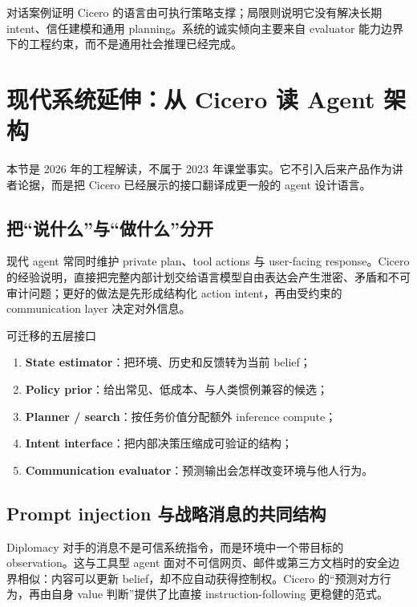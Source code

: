 \documentclass[a4paper]{article}
\begin{document}
对话案例证明 Cicero 的语言由可执行策略支撑；局限则说明它没有解决长期 intent、信任建模和通用 planning。系统的诚实倾向主要来自 evaluator 能力边界下的工程约束，而不是通用社会推理已经完成。

\section{现代系统延伸：从 Cicero 读 Agent 架构}

本节是 2026 年的工程解读，不属于 2023 年课堂事实。它不引入后来产品作为讲者论据，而是把 Cicero 已经展示的接口翻译成更一般的 agent 设计语言。

\subsection{把“说什么”与“做什么”分开}

现代 agent 常同时维护 private plan、tool actions 与 user-facing response。Cicero 的经验说明，直接把完整内部计划交给语言模型自由表达会产生泄密、矛盾和不可审计问题；更好的做法是先形成结构化 action intent，再由受约束的 communication layer 决定对外信息。

\begin{knowledgebox}{可迁移的五层接口}
\begin{enumerate}
  \item \textbf{State estimator}：把环境、历史和反馈转为当前 belief；
  \item \textbf{Policy prior}：给出常见、低成本、与人类惯例兼容的候选；
  \item \textbf{Planner / search}：按任务价值分配额外 inference compute；
  \item \textbf{Intent interface}：把内部决策压缩成可验证的结构；
  \item \textbf{Communication evaluator}：预测输出会怎样改变环境与他人行为。
\end{enumerate}
\end{knowledgebox}

\subsection{Prompt injection 与战略消息的共同结构}

Diplomacy 对手的消息不是可信系统指令，而是环境中一个带目标的 observation。这与工具型 agent 面对不可信网页、邮件或第三方文档时的安全边界相似：内容可以更新 belief，却不应自动获得控制权。Cicero 的“预测对方行为，再由自身 value 判断”提供了比直接 instruction-following 更稳健的范式。
\end{document}
